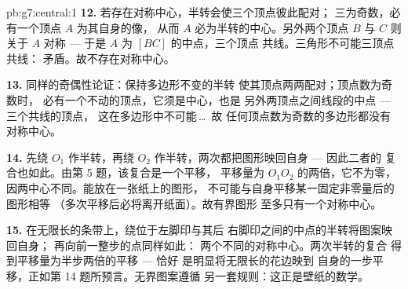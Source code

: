 \begin{solution}{pb:g7:central:1}
\textbf{12.} 若存在对称中心，半转会使三个顶点彼此配对；
三为奇数，必有一个顶点 $A$ 为其自身的像，
从而 $A$ 必为半转的中心。另外两个顶点 $B$ 与 $C$
则关于 $A$ 对称 ---
于是 $A$ 为 $[BC]$ 的中点，三个顶点
共线。三角形不可能三顶点共线：
矛盾。故不存在对称中心。

\textbf{13.} 同样的奇偶性论证：保持多边形不变的半转
使其顶点两两配对；顶点数为奇数时，
必有一个不动的顶点，它须是中心，也是
另外两顶点之间线段的中点 --- 三个共线的顶点，
这在多边形中不可能\,\dots\ 故
任何顶点数为奇数的多边形都没有对称中心。

\textbf{14.} 先绕 $O_1$ 作半转，再绕
$O_2$ 作半转，两次都把图形映回自身 --- 因此二者的
复合也如此。由第 5 题，该复合是一个平移，
平移量为 $O_1 O_2$ 的两倍，它不为零，
因两中心不同。能放在一张纸上的图形，
不可能与自身平移某一固定非零量后的图形相等
（多次平移后必将离开纸面）。故有界图形
至多只有一个对称中心。

\textbf{15.} 在无限长的条带上，绕位于左脚印与其后
右脚印之间的中点的半转将图案映回自身；
再向前一整步的点同样如此：
两个不同的对称中心。两次半转的复合
得到平移量为半步两倍的平移 --- 恰好
是明显将无限长的花边映到
自身的一步平移，正如第 14 题所预言。无界图案遵循
另一套规则：这正是壁纸的数学。
\end{solution}
